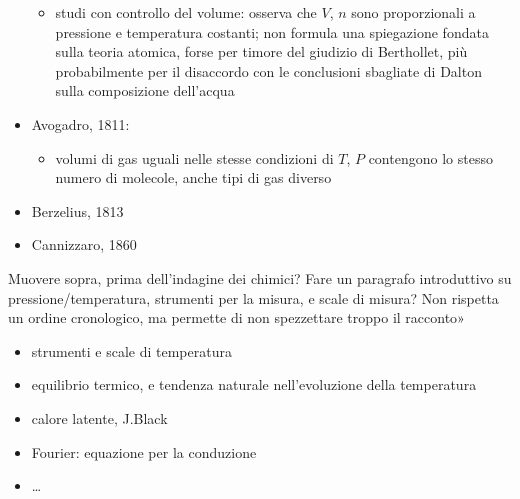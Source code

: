 \documentclass[letterpaper,10pt,italian]{jupyterBook}
\begin{document}
\begin{itemize}
\begin{itemize}
\item {} 
\sphinxAtStartPar
studi con controllo del volume: osserva che \(V\), \(n\) sono proporzionali a pressione e temperatura costanti; non formula una spiegazione fondata sulla teoria atomica, forse per timore del giudizio di Berthollet, più probabilmente per il disaccordo con le conclusioni sbagliate di Dalton sulla composizione dell’acqua

\end{itemize}

\item {} 
\sphinxAtStartPar
Avogadro, 1811:
\begin{itemize}
\item {} 
\sphinxAtStartPar
volumi di gas uguali nelle stesse condizioni di \(T\), \(P\) contengono lo stesso numero di molecole, anche tipi di gas diverso

\end{itemize}

\item {} 
\sphinxAtStartPar
Berzelius, 1813

\item {} 
\sphinxAtStartPar
Cannizzaro, 1860 

\end{itemize}

\sphinxAtStartPar
{} Muovere sopra, prima dell’indagine dei chimici? Fare un paragrafo introduttivo su pressione/temperatura, strumenti per la misura, e scale di misura? Non rispetta un ordine cronologico, ma permette di non spezzettare troppo il racconto»
\begin{itemize}
\item {} 
\sphinxAtStartPar
strumenti e scale di temperatura

\item {} 
\sphinxAtStartPar
equilibrio termico, e tendenza naturale nell’evoluzione della temperatura

\item {} 
\sphinxAtStartPar
calore latente, J.Black

\item {} 
\sphinxAtStartPar
Fourier: equazione per la conduzione

\item {} 
\sphinxAtStartPar
…

\end{itemize}
\end{document}
